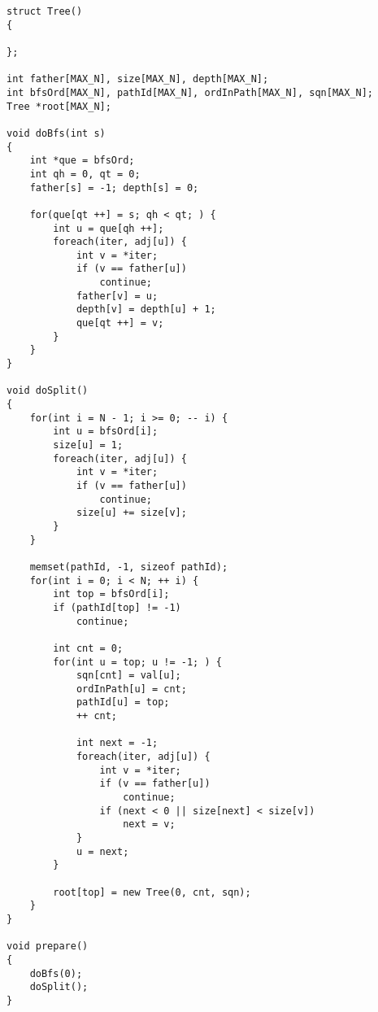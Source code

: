 \begin{lstlisting}
struct Tree()
{
	
};

int father[MAX_N], size[MAX_N], depth[MAX_N];
int bfsOrd[MAX_N], pathId[MAX_N], ordInPath[MAX_N], sqn[MAX_N];
Tree *root[MAX_N];

void doBfs(int s)
{
	int *que = bfsOrd;
	int qh = 0, qt = 0;
	father[s] = -1; depth[s] = 0;
	
	for(que[qt ++] = s; qh < qt; ) {
		int u = que[qh ++];
		foreach(iter, adj[u]) {
			int v = *iter;
			if (v == father[u])
				continue;
			father[v] = u;
			depth[v] = depth[u] + 1;
			que[qt ++] = v;
		}
	}
}

void doSplit()
{
	for(int i = N - 1; i >= 0; -- i) {
		int u = bfsOrd[i];
		size[u] = 1;
		foreach(iter, adj[u]) {
			int v = *iter;
			if (v == father[u])
				continue;
			size[u] += size[v];
		}
	}
	
	memset(pathId, -1, sizeof pathId);
	for(int i = 0; i < N; ++ i) {
		int top = bfsOrd[i];
		if (pathId[top] != -1)
			continue;
		
		int cnt = 0;
		for(int u = top; u != -1; ) {
			sqn[cnt] = val[u];
			ordInPath[u] = cnt;
			pathId[u] = top;
			++ cnt;
			
			int next = -1;
			foreach(iter, adj[u]) {
				int v = *iter;
				if (v == father[u])
					continue;
				if (next < 0 || size[next] < size[v])
					next = v;
			}
			u = next;
		}
		
		root[top] = new Tree(0, cnt, sqn);
	}
}

void prepare()
{
	doBfs(0);
	doSplit();
}

\end{lstlisting}

